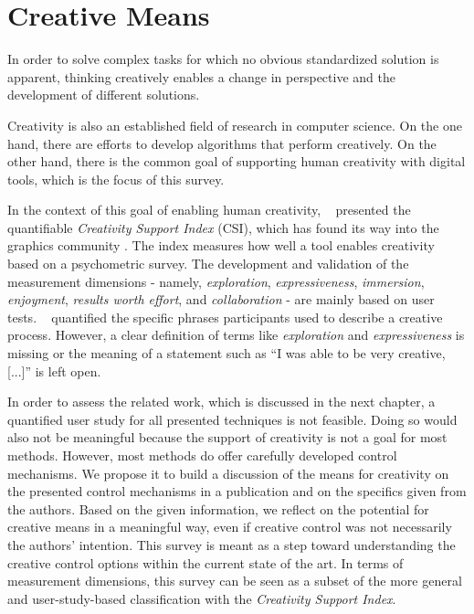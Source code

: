 

\section{Creative Means}
\label{sec:taxo_creativity}

In order to solve complex tasks for which no obvious standardized solution is apparent, thinking creatively enables a change in perspective and the development of different solutions.


Creativity is also an established field of research in computer science. On the one hand, there are efforts to develop algorithms that perform creatively. On the other hand, there is the common goal of supporting human creativity with digital tools, which is the focus of this survey.

In the context of this goal of enabling human creativity, \citeauthor*{cherry_2014_qcs}~\cite{cherry_2014_qcs} presented the quantifiable \textit{Creativity Support Index} (CSI), which has found its way into the graphics community \cite{shugrina_2017_ppi}. The index measures how well a tool enables creativity based on a psychometric survey. The development and validation of the measurement dimensions - namely, \textit{exploration}, \textit{expressiveness}, \textit{immersion}, \textit{enjoyment}, \textit{results worth effort}, and \textit{collaboration} - are mainly based on user tests. \citeauthor*{cherry_2014_qcs}~\cite{cherry_2014_qcs} quantified the specific phrases participants used to describe a creative process. However, a clear definition of terms like  \textit{exploration} and \textit{expressiveness} is missing or the meaning of a statement such as ``I was able to be very creative, [...]'' is left open. 

In order to assess the related work, which is discussed in the next chapter, a quantified user study for all presented techniques is not feasible. Doing so would also not be meaningful because the support of creativity is not a goal for most methods. However, most methods do offer carefully developed control mechanisms. We propose it to build a discussion of the means for creativity on the presented control mechanisms in a publication and on the specifics given from the authors. Based on the given information, we reflect on the potential for creative means in a meaningful way, even if creative control was not necessarily the authors' intention. This survey is meant as a step toward understanding the creative control options within the current state of the art. In terms of measurement dimensions, this survey can be seen as a subset of the more general and user-study-based classification with the \textit{Creativity Support Index}.




